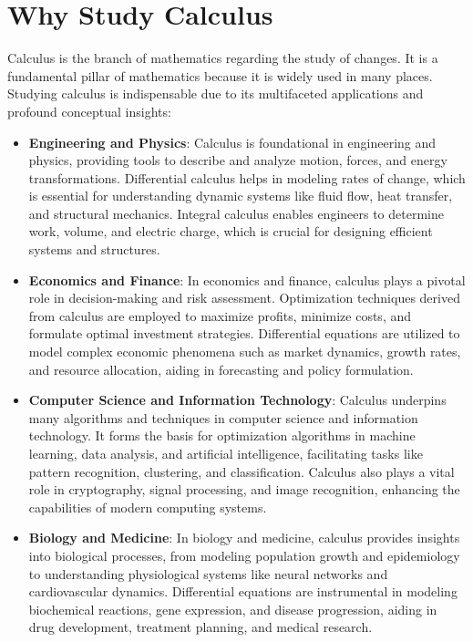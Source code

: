\section{Why Study Calculus}

Calculus is the branch of mathematics regarding the study of changes. It is a fundamental pillar of mathematics because it is widely used in many places.
Studying calculus is indispensable due to its multifaceted applications and profound conceptual insights:

\begin{itemize}
    \item \textbf{Engineering and Physics}: Calculus is foundational in engineering and physics, providing tools to describe and analyze motion, forces, and energy transformations. Differential calculus helps in modeling rates of change, which is essential for understanding dynamic systems like fluid flow, heat transfer, and structural mechanics. Integral calculus enables engineers to determine work, volume, and electric charge, which is crucial for designing efficient systems and structures.
    
    \item \textbf{Economics and Finance}: In economics and finance, calculus plays a pivotal role in decision-making and risk assessment. Optimization techniques derived from calculus are employed to maximize profits, minimize costs, and formulate optimal investment strategies. Differential equations are utilized to model complex economic phenomena such as market dynamics, growth rates, and resource allocation, aiding in forecasting and policy formulation.
    
    \item \textbf{Computer Science and Information Technology}: Calculus underpins many algorithms and techniques in computer science and information technology. It forms the basis for optimization algorithms in machine learning, data analysis, and artificial intelligence, facilitating tasks like pattern recognition, clustering, and classification. Calculus also plays a vital role in cryptography, signal processing, and image recognition, enhancing the capabilities of modern computing systems.
    
    \item \textbf{Biology and Medicine}: In biology and medicine, calculus provides insights into biological processes, from modeling population growth and epidemiology to understanding physiological systems like neural networks and cardiovascular dynamics. Differential equations are instrumental in modeling biochemical reactions, gene expression, and disease progression, aiding in drug development, treatment planning, and medical research.
    

\end{itemize}
